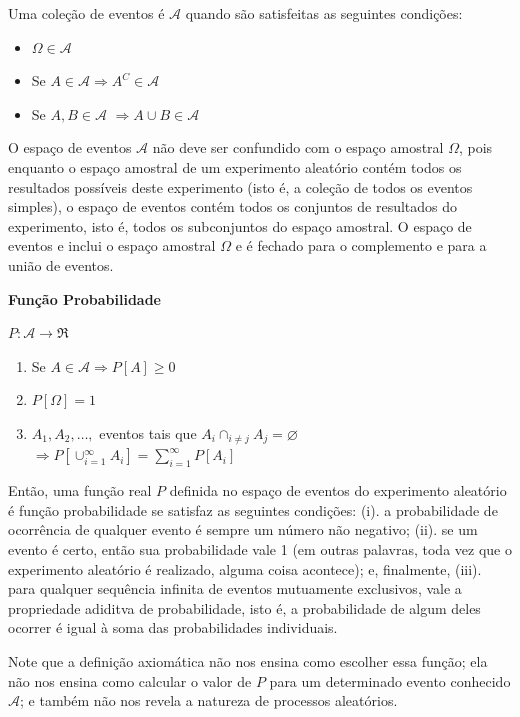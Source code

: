 \documentclass[
]{book}
\providecommand{\tightlist}{%
  \setlength{\itemsep}{0pt}\setlength{\parskip}{0pt}}
\theoremstyle{definition}
\theoremstyle{definition}
\theoremstyle{definition}
\theoremstyle{remark}
\begin{document}
Uma coleção de eventos é \(\mathcal{A}\) quando são satisfeitas as seguintes condições:

\begin{itemize}
\tightlist
\item
  \(\Omega \in \mathcal{A}\)
\item
  Se \(A \in \mathcal{A} \Longrightarrow A^C \in \mathcal{A}\)
\item
  Se \(A, B \in \mathcal{A}\) \(\Longrightarrow A \cup B \in \mathcal{A}\)
\end{itemize}

O espaço de eventos \(\mathcal{A}\) não deve ser confundido com o espaço amostral \(\Omega\), pois enquanto o espaço amostral de um experimento aleatório contém todos os resultados possíveis deste experimento (isto é, a coleção de todos os eventos simples), o espaço de eventos contém todos os conjuntos de resultados do experimento, isto é, todos os subconjuntos do espaço amostral. O espaço de eventos e inclui o espaço amostral \(\Omega\) e é fechado para o complemento e para a união de eventos.

\textbf{Função Probabilidade}

\(P: \mathcal{A} \longrightarrow \Re\)

\begin{enumerate}
\def\labelenumi{\roman{enumi}.}
\item
  Se \(A \in \mathcal{A} \Longrightarrow P[A] \geq 0\)
\item
  \(P[\Omega] = 1\)
\item
  \(A_1, A_2, \ldots,\) eventos tais que \(A_i \cap_{i \neq j} A_j = \varnothing\)\\
  \(\Longrightarrow P\left[ \cup_{i=1}^\infty A_i\right] = \sum_{i=1}^{\infty} P[A_i]\)
\end{enumerate}

Então, uma função real \(P\) definida no espaço de eventos do experimento aleatório é função probabilidade se satisfaz as seguintes condições: (i). a probabilidade de ocorrência de qualquer evento é sempre um número não negativo; (ii). se um evento é certo, então sua probabilidade vale 1 (em outras palavras, toda vez que o experimento aleatório é realizado, alguma coisa acontece); e, finalmente, (iii). para qualquer sequência infinita de eventos mutuamente exclusivos, vale a propriedade adiditva de probabilidade, isto é, a probabilidade de algum deles ocorrer é igual à soma das probabilidades individuais.

Note que a definição axiomática não nos ensina como escolher essa função; ela não nos ensina como calcular o valor de \(P\) para um determinado evento conhecido \(\mathcal{A}\); e também não nos revela a natureza de processos aleatórios.
\end{document}
